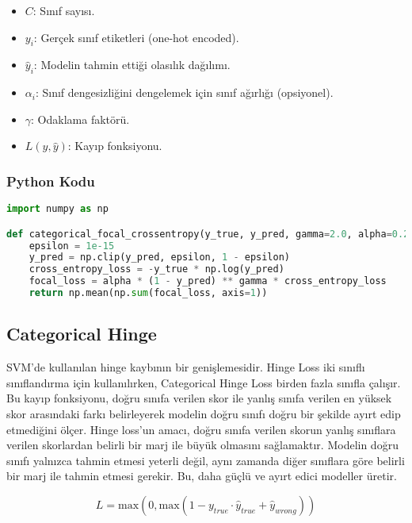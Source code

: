 \begin{itemize}
    \item $C$: Sınıf sayısı.
    \item $y_i$: Gerçek sınıf etiketleri (one-hot encoded).
    \item $\hat{y}_i$: Modelin tahmin ettiği olasılık dağılımı.
    \item $\alpha_i$: Sınıf dengesizliğini dengelemek için sınıf ağırlığı (opsiyonel).
    \item $\gamma$: Odaklama faktörü.
    \item $L(y, \hat{y})$: Kayıp fonksiyonu.
\end{itemize}

\subsubsection{Python Kodu}

\begin{lstlisting}[language=Python]
import numpy as np

def categorical_focal_crossentropy(y_true, y_pred, gamma=2.0, alpha=0.25):
    epsilon = 1e-15
    y_pred = np.clip(y_pred, epsilon, 1 - epsilon)
    cross_entropy_loss = -y_true * np.log(y_pred)
    focal_loss = alpha * (1 - y_pred) ** gamma * cross_entropy_loss
    return np.mean(np.sum(focal_loss, axis=1))
\end{lstlisting}

\newpage

\subsection{Categorical Hinge}

SVM'de kullanılan hinge kaybının bir genişlemesidir. Hinge Loss iki sınıflı sınıflandırma için kullanılırken, Categorical Hinge Loss birden fazla sınıfla çalışır. Bu kayıp fonksiyonu, doğru sınıfa verilen skor ile yanlış sınıfa verilen en yüksek skor arasındaki farkı belirleyerek modelin doğru sınıfı doğru bir şekilde ayırt edip etmediğini ölçer. Hinge loss'un amacı, doğru sınıfa verilen skorun yanlış sınıflara verilen skorlardan belirli bir marj ile büyük olmasını sağlamaktır. Modelin doğru sınıfı yalnızca tahmin etmesi yeterli değil, aynı zamanda diğer sınıflara göre belirli bir marj ile tahmin etmesi gerekir. Bu, daha güçlü ve ayırt edici modeller üretir.

\[ L = \text{max}(0, \text{max}(1 - y_{true} \cdot \hat{y}_{true} + \hat{y}_{wrong})) \]

